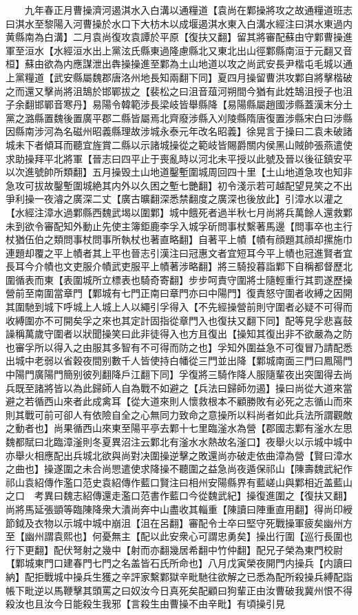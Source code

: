 　　九年春正月曹操濟河遏淇水入白溝以通糧道【袁尚在鄴操將攻之故通糧道班志曰淇水至黎陽入河曹操於水口下大枋木以成堰遏淇水東入白溝水經注曰淇水東過内黄縣南為白溝】二月袁尚復攻袁譚於平原【復扶又翻】留其將審配蘇由守鄴曹操進軍至洹水【水經洹水出上黨泫氏縣東過隆慮縣北又東北出山徑鄴縣南洹于元翻又音桓】蘇由欲為内應謀泄出犇操操進至鄴為土山地道以攻之尚武安長尹楷屯毛城以通上黨糧道【武安縣屬魏郡唐洛州地長知兩翻下同】夏四月操留曹洪攻鄴自將擊楷破之而還又擊尚將沮鵠於邯鄲拔之【裴松之曰沮音葅河朔間今猶有此姓鵠沮授子也沮子余翻邯鄲音寒丹】易陽令韓範涉長梁岐皆舉縣降【易陽縣屬趙國涉縣蓋漢末分土黨之潞縣置魏後置廣平郡二縣皆屬焉北齊廢涉縣入刈陵縣隋唐復置涉縣宋白曰涉縣因縣南涉河為名磁州昭義縣理故涉城永泰元年改名昭義】徐晃言于操曰二袁未破諸城未下者傾耳而聽宜旌賞二縣以示諸城操從之範岐皆賜爵關内侯黑山賊帥張燕遣使求助操拜平北將軍【晉志曰四平止于喪亂時以河北未平授以此號及晉以後征鎮安平以次進號帥所類翻】五月操毁土山地道鑿塹圍城周回四十里【土山地道急攻也知非急攻可拔故鑿塹圍城絶其内外以久困之塹七艷翻】初令淺示若可越配望見笑之不出爭利操一夜濬之廣深二丈【廣古曠翻深悉禁翻度之廣深也後放此】引漳水以灌之【水經注漳水過鄴縣西魏武堨以圍鄴】城中餓死者過半秋七月尚將兵萬餘人還救鄴未到欲令審配知外動止先使主簿鉅鹿李孚入城孚斫問事杖繫著馬邊【問事卒也主行杖猶伍伯之類問事杖問事所執杖也著直略翻】自著平上幘【幘有顔題其顔却摞施巾連題却覆之平上幘者其上平也晉志引漢注曰冠惠文者宜短耳今平上幘也冠進賢者宜長耳今介幘也文吏服介幘武吏服平上幘著涉略翻】將三騎投暮詣鄴下自稱都督歷北圍循表而東【表圍城所立標表也騎奇寄翻】步步呵責守圍將士隨輕重行其罰遂歷操營前至南圍當章門【鄴城有七門正南曰章門亦曰中陽門】復責怒守圍者收縛之因開其圍馳到城下呼城上人城上人以繩引孚得入【不先經操營前則守圍者必疑不可得而收縛圍亦不可開矣孚之來也其定計固指從章門入也復扶又翻下同】配等見孚悲喜鼓譟稱萬歲守圍者以狀聞操笑曰此非徒得入也方且復出【操知其復出非不欲嚴為之防也審孚所以得入之由服其多智有不可得而防之也】孚知外圍益急不可復冒乃請配悉出城中老弱以省穀夜間别數千人皆使持白幡從三門並出降【鄴城南面三門曰鳳陽門中陽門廣陽門簡别彼列翻降戶江翻下同】孚復將三騎作降人服隨輩夜出突圍得去尚兵既至諸將皆以為此歸師人自為戰不如避之【兵法曰歸師勿遏】操曰尚從大道來當避之若循西山來者此成禽耳【從大道來則人懷救根本不顧勝敗有必死之志循山而來則其戰可前可卻人有依險自全之心無同力致命之意操所以料尚者如此兵法所謂觀敵之動者也】尚果循西山來東至陽平亭去鄴十七里臨滏水為營【郡國志鄴有滏水左思魏都賦曰北臨漳滏則冬夏異沼注云鄴北有滏水水熱故名滏口】夜舉火以示城中城中亦舉火相應配出兵城北欲與尚對决圍操逆擊之敗還尚亦破走依曲漳為營【賢曰漳水之曲也】操遂圍之未合尚愳遣使求降操不聽圍之益急尚夜遁保祁山【陳壽魏武紀作祁山袁紹傳作濫口范史袁紹傳作藍口賢注曰相州安陽縣界有藍嵯山與鄴相近盖藍山之口　考異曰魏志紹傳還走濫口范書作藍口今從魏武紀】操復進圍之【復扶又翻】尚將馬延張顗等臨陳降衆大潰尚奔中山盡收其輜重【陳讀曰陣重直用翻】得尚印綬節鉞及衣物以示城中城中崩沮【沮在呂翻】審配令士卒曰堅守死戰操軍疲矣幽州方至【幽州謂袁熙也】何憂無主【配以此安衆心可謂忠勇矣】操出行圍【巡行長圍也行下更翻】配伏弩射之幾中【射而亦翻幾居希翻中竹仲翻】配兄子榮為東門校尉【鄴城東門口建春門七門之名盖皆石氏所命也】八月戊寅榮夜開門内操兵【内讀曰納】配拒戰城中操兵生獲之辛評家繫鄴獄辛毗馳往欲解之已悉為配所殺操兵縛配詣帳下毗逆以馬鞭擊其頭罵之曰奴汝今日真死矣配顧曰狗輩正由汝曹破我冀州恨不得殺汝也且汝今日能殺生我邪【言殺生由曹操不由辛毗】有頃操引見